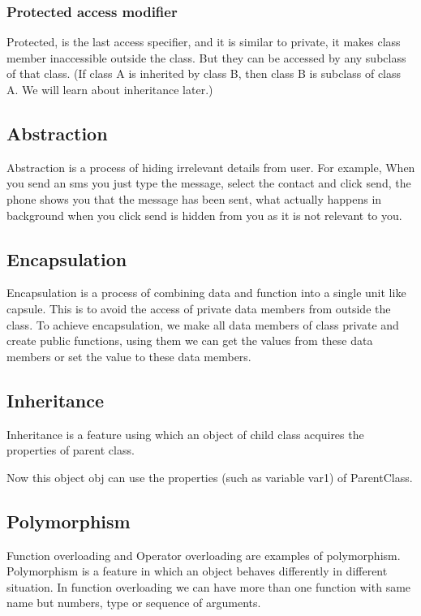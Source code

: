 \documentclass[11pt, a4paper]{article}
\begin{document}
\subsubsection{Protected access modifier}
Protected, is the last access specifier, and it is similar to private,
it makes class member inaccessible outside the class. But they can be accessed
by any subclass of that class. (If class A is inherited by class B, then class B
is subclass of class A. We will learn about inheritance later.)


\subsection{Abstraction}
Abstraction is a process of hiding irrelevant details from user. For example,
When you send an sms you just type the message, select the contact and click send,
the phone shows you that the message has been sent, what actually happens in background when you click
send is hidden from you as it is not relevant to you.

\subsection{Encapsulation}
Encapsulation is a process of combining data and function into a single unit like capsule.
This is to avoid the access of private data members from outside the class.
To achieve encapsulation, we make all data members of class private and create public
functions, using them we can get the values from these data members or set the value
to these data members.

\subsection{Inheritance}
Inheritance is a feature using which an object of child class acquires
the properties of parent class.

Now this object obj can use the properties (such as variable var1) of ParentClass.

\subsection{Polymorphism}
Function overloading and Operator overloading are examples of polymorphism.
Polymorphism is a feature in which an object behaves differently in different situation.
In function overloading we can have more than one function with same name but numbers,
type or sequence of arguments.

\end{document}
